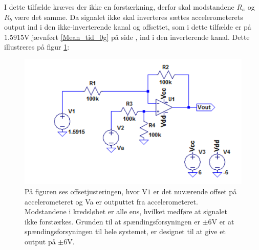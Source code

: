 I dette tilfælde kræves der ikke en forstærkning, derfor skal modstandene $R_{a}$ og $R_{b}$ være det samme. Da signalet ikke skal inverteres sættes accelerometerets output ind i den ikke-inverterende kanal og offsettet, som i dette tilfælde er på $1.5915$V jævnført  \ref{Mean_tid_0g} på side \pageref{Mean_tid_0g}, ind i den inverterende kanal. Dette illustreres på figur \ref{fig:Offset_generisk}:
\begin{figure}[H]
\centering
\includegraphics[scale=1]{figures/cProblemloesning/Offset_generisk.png}
\caption{På figuren ses offsetjusteringen, hvor V$1$ er det nuværende offset på accelerometeret og Va er outputtet fra accelerometeret. Modstandene i kredsløbet er alle ens, hvilket medføre at signalet ikke forstærkes. Grunden til at spændingsforsyningen er $\pm 6$V er at spændingsforsyningen til hele systemet, er designet til at give et output på $\pm 6$V.}
\label{fig:Offset_generisk}
\end{figure}


